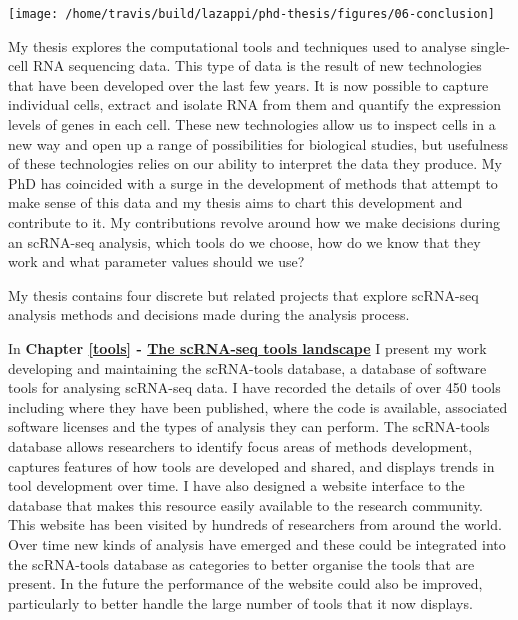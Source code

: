 \documentclass[11pt,a4paper,titlepage,twoside,openright]{style/unimelbthesis}
\theoremstyle{definition}
\theoremstyle{definition}
\theoremstyle{definition}
\theoremstyle{remark}
\begin{document}
\begin{mainmatter}
\begin{center}\texttt{[image: /home/travis/build/lazappi/phd-thesis/figures/06-conclusion]} \end{center}

\clearpage

My thesis explores the computational tools and techniques used to analyse single-cell RNA sequencing data. This type of data is the result of new technologies that have been developed over the last few years. It is now possible to capture individual cells, extract and isolate RNA from them and quantify the expression levels of genes in each cell. These new technologies allow us to inspect cells in a new way and open up a range of possibilities for biological studies, but usefulness of these technologies relies on our ability to interpret the data they produce. My PhD has coincided with a surge in the development of methods that attempt to make sense of this data and my thesis aims to chart this development and contribute to it. My contributions revolve around how we make decisions during an scRNA-seq analysis, which tools do we choose, how do we know that they work and what parameter values should we use?

My thesis contains four discrete but related projects that explore scRNA-seq analysis methods and decisions made during the analysis process.

In \textbf{Chapter \ref{tools} - \protect\hyperlink{tools}{The scRNA-seq tools landscape}} I present my work developing and maintaining the scRNA-tools database, a database of software tools for analysing scRNA-seq data. I have recorded the details of over 450 tools including where they have been published, where the code is available, associated software licenses and the types of analysis they can perform. The scRNA-tools database allows researchers to identify focus areas of methods development, captures features of how tools are developed and shared, and displays trends in tool development over time. I have also designed a website interface to the database that makes this resource easily available to the research community. This website has been visited by hundreds of researchers from around the world. Over time new kinds of analysis have emerged and these could be integrated into the scRNA-tools database as categories to better organise the tools that are present. In the future the performance of the website could also be improved, particularly to better handle the large number of tools that it now displays.


\end{mainmatter}
\end{document}
